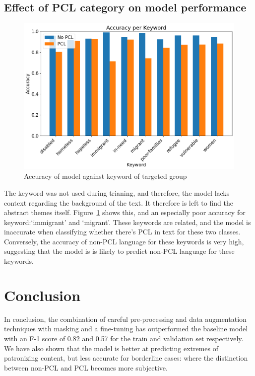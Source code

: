 \documentclass[11pt,a4paper]{article}
\begin{document}
\subsection*{Effect of PCL category on model performance}

\begin{figure}[H]
    \centering
    \includegraphics[width=\linewidth]{figures/accuracy_per_pcl_type_keyword.png}
    \caption{Accuracy of model against keyword of targeted group}
    \label{fig:accuracy-keyword}
\end{figure}


The keyword was not used during trianing, and therefore, the model lacks context regarding the background of the text. It therefore is left to find the abstract themes itself. Figure~\ref{fig:accuracy-keyword} shows this, and an especially poor accuracy for keyword:`immigrant' and `migrant'. These keywords are related, and the model is inaccurate when classifying whether there's PCL in text for these two classes. Conversely, the accuracy of non-PCL language for these keywords is very high, suggesting that the model is is likely to predict non-PCL language for these keywords.

\section{Conclusion}

In conclusion, the combination of careful pre-processing and data augmentation techniques with masking and a fine-tuning has outperformed the baseline model with an F-1 score of 0.82 and 0.57 for the train and validation set respectively. We have also shown that the model is better at predicting extremes of patronizing content, but less accurate for borderline cases: where the distinction between non-PCL and PCL becomes more subjective. 
\end{document}

